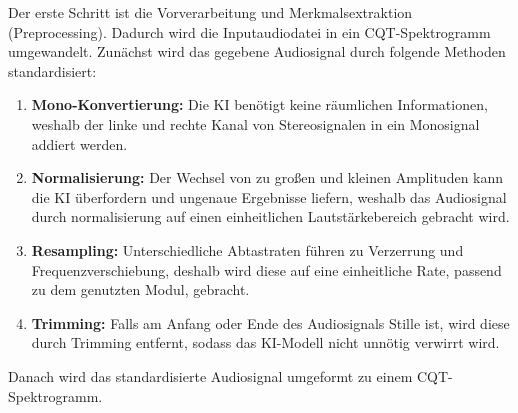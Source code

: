 \begin{center}
    \vspace{1em}
    \vspace{1em}
\end{center}

Der erste Schritt ist die Vorverarbeitung und Merkmalsextraktion (Preprocessing).
Dadurch wird die Inputaudiodatei in ein CQT-Spektrogramm umgewandelt.
Zunächst wird das gegebene Audiosignal durch folgende Methoden standardisiert:
\begin{enumerate}
    \item \textbf{Mono-Konvertierung:} Die KI benötigt keine räumlichen Informationen, weshalb der linke und rechte Kanal von Stereosignalen in ein Monosignal addiert werden.
    \item \textbf{Normalisierung:} Der Wechsel von zu großen und kleinen Amplituden kann die KI überfordern und ungenaue Ergebnisse liefern, weshalb das Audiosignal durch normalisierung auf einen einheitlichen Lautstärkebereich gebracht wird.
    \item \textbf{Resampling:} Unterschiedliche Abtastraten führen zu Verzerrung und Frequenzverschiebung, deshalb wird diese auf eine einheitliche Rate, passend zu dem genutzten Modul, gebracht.
    \item \textbf{Trimming:} Falls am Anfang oder Ende des Audiosignals Stille ist, wird diese durch Trimming entfernt, sodass das KI-Modell nicht unnötig verwirrt wird.
\end{enumerate}
Danach wird das standardisierte Audiosignal umgeformt zu einem CQT-Spektrogramm.

